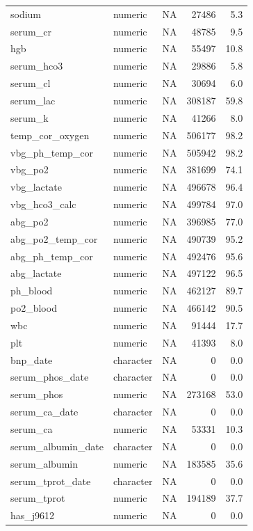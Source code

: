 \documentclass[
  11pt,
  letterpaper,
  DIV=11,
  numbers=noendperiod]{scrartcl}
\begin{document}
\begin{longtable*}{llrrr}
\addlinespace
sodium & numeric & NA & 27486 & 5.3\\
serum\_cr & numeric & NA & 48785 & 9.5\\
hgb & numeric & NA & 55497 & 10.8\\
serum\_hco3 & numeric & NA & 29886 & 5.8\\
serum\_cl & numeric & NA & 30694 & 6.0\\
\addlinespace
serum\_lac & numeric & NA & 308187 & 59.8\\
serum\_k & numeric & NA & 41266 & 8.0\\
temp\_cor\_oxygen & numeric & NA & 506177 & 98.2\\
vbg\_ph\_temp\_cor & numeric & NA & 505942 & 98.2\\
vbg\_po2 & numeric & NA & 381699 & 74.1\\
\addlinespace
vbg\_lactate & numeric & NA & 496678 & 96.4\\
vbg\_hco3\_calc & numeric & NA & 499784 & 97.0\\
abg\_po2 & numeric & NA & 396985 & 77.0\\
abg\_po2\_temp\_cor & numeric & NA & 490739 & 95.2\\
abg\_ph\_temp\_cor & numeric & NA & 492476 & 95.6\\
\addlinespace
abg\_lactate & numeric & NA & 497122 & 96.5\\
ph\_blood & numeric & NA & 462127 & 89.7\\
po2\_blood & numeric & NA & 466142 & 90.5\\
wbc & numeric & NA & 91444 & 17.7\\
plt & numeric & NA & 41393 & 8.0\\
\addlinespace
bnp\_date & character & NA & 0 & 0.0\\
serum\_phos\_date & character & NA & 0 & 0.0\\
serum\_phos & numeric & NA & 273168 & 53.0\\
serum\_ca\_date & character & NA & 0 & 0.0\\
serum\_ca & numeric & NA & 53331 & 10.3\\
\addlinespace
serum\_albumin\_date & character & NA & 0 & 0.0\\
serum\_albumin & numeric & NA & 183585 & 35.6\\
serum\_tprot\_date & character & NA & 0 & 0.0\\
serum\_tprot & numeric & NA & 194189 & 37.7\\
has\_j9612 & numeric & NA & 0 & 0.0\\

\end{longtable*}
\end{document}
